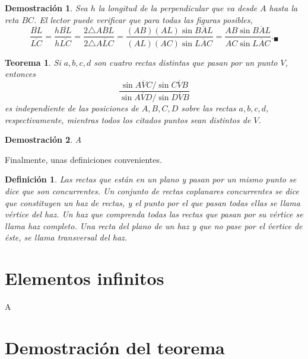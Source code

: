 \documentclass[a4paper,11pt]{article}
\theoremstyle{teoremas}
\newtheorem{teorema}{Teorema}[section]
\theoremstyle{ejemplos}
\theoremstyle{definiciones}
\theoremstyle{lemas}
\newtheorem*{definicion}{Definici\'on}
\newtheorem*{demostracion}{Demostraci\'on}
\begin{document}
\begin{demostracion}
 Sea $h$ la longitud de la perpendicular que va desde $A$ hasta la reta $BC$. El lector puede verificar que para todas las figuras posibles,
 \begin{equation*}
  \frac{\overline{BL}}{\overline{LC}} =
  \frac{h\overline{BL}}{h\overline{LC}} =
  \frac{2\triangle\overline{ABL}}{2\triangle\overline{ALC}} =
  \frac{(AB)(AL)\sin{\overline{BAL}}}{(AL)(AC)\sin{\overline{LAC}}} = 
  \frac{AB \sin{\overline{BAL}}}{AC \sin{\overline{LAC}}}.{}_{\blacksquare}
 \end{equation*}
\end{demostracion}

\begin{teorema}
 Si $a,b,c,d$ son cuatro rectas distintas que pasan por un punto $V$, entonces
 \begin{equation*}
  \frac{\sin{\overline{AVC}}/\sin{\overline{CVB}} }{\sin{\overline{AVD}}/\sin{\overline{DVB}}}
 \end{equation*}
 es independiente de las posiciones de $A,B,C,D$ sobre las rectas $a,b,c,d$, respectivamente, mientras todos los citados puntos sean distintos de $V$.
\end{teorema}

\begin{demostracion}
 A
\end{demostracion}

Finalmente, unas definiciones convenientes.

\begin{definicion}
 Las rectas que est\'an en un plano y pasan por un mismo punto se dice que son \textit{concurrentes}. Un conjunto de rectas coplanares concurrentes se dice que constituyen un \textit{haz} de rectas, y el punto por el que pasan todas ellas se llama \textit{v\'ertice} del haz. Un haz que comprenda todas las rectas que pasan por su v\'ertice se llama \textit{haz completo}. Una recta del plano de un haz y que no pase por el \'vertice de \'este, se llama \textit{transversal} del haz.
\end{definicion}


\section{Elementos infinitos}

A

\section{Demostraci\'on del teorema}
\end{document}
